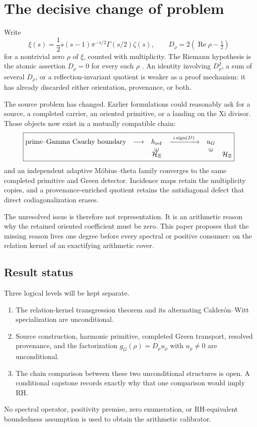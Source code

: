 \documentclass[11pt]{article}
\theoremstyle{definition}
\theoremstyle{remark}
\numberwithin{equation}{section}
\newcommand{\cH}{\mathcal H}
\newcommand{\Rea}{\operatorname{Re}}
\begin{document}
\section{The decisive change of problem}

Write
\[
 \xi(s)=\frac12s(s-1)\pi^{-s/2}\Gamma(s/2)\zeta(s),
 \qquad D_\rho=2(\Rea\rho-\tfrac12)
\]
for a nontrivial zero $\rho$ of $\xi$, counted with multiplicity.  The
Riemann hypothesis is the atomic assertion $D_\rho=0$ for every such
$\rho$ \cite{Riemann1859,Titchmarsh1986}.  An identity involving
$D_\rho^2$, a sum of several $D_\rho$, or a
reflection-invariant quotient is weaker as a proof mechanism: it has already
discarded either orientation, provenance, or both.

The source problem has changed.  Earlier formulations could reasonably ask
for a source, a completed carrier, an oriented primitive, or a landing on
the Xi divisor.  Those objects now exist in a mutually compatible chain:
\begin{equation}
 \boxed{
 \begin{matrix}
 \text{prime--Gamma Cauchy boundary}
   &\longrightarrow& h_{\rm ref}
   &\xrightarrow{\ i\operatorname{sign}(D)\ }& u_G\\
 && \rotatebox{90}{$\in$} && \rotatebox{90}{$\in$}\\[-2mm]
 && \cH_\Xi &&& \cH_\Xi
 \end{matrix}}
 \label{eq:source-chain}
\end{equation}
and an independent adaptive M\"obius--theta family converges to the same
completed primitive and Green detector.  Incidence maps retain the
multiplicity copies, and a provenance-enriched quotient retains the
antidiagonal defect that direct codiagonalization erases.

The unresolved issue is therefore not representation.  It is an arithmetic
reason why the retained oriented coefficient must be zero.  This paper
proposes that the missing reason lives one degree before every spectral or
positive consumer: on the relation kernel of an exactifying arithmetic
cover.

\subsection{Result status}

Three logical levels will be kept separate.
\begin{enumerate}[label=(\roman*)]
\item The relation-kernel transgression theorem and its alternating
Calder\'on--Witt specialization are unconditional.
\item Source construction, harmonic primitive, completed Green transport,
resolved provenance, and the factorization $g_G(\rho)=D_\rho u_\rho$ with
$u_\rho\ne0$ are unconditional.
\item The chain comparison between these two unconditional structures is
open.  A conditional capstone records exactly why that one comparison would
imply RH.
\end{enumerate}
No spectral operator, positivity premise, zero enumeration, or RH-equivalent
boundedness assumption is used to obtain the arithmetic calibrator.
\end{document}

